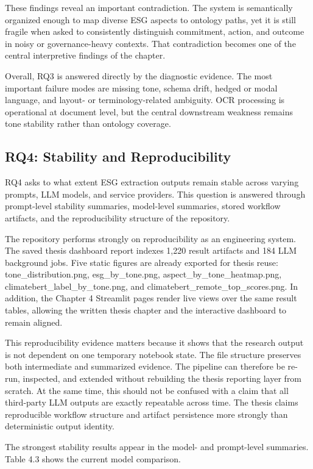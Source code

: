 \documentclass[english, online, cse, master]{dithesis}
\begin{document}
These findings reveal an important contradiction. The system is semantically organized enough to map diverse ESG aspects to ontology paths, yet it is still fragile when asked to consistently distinguish commitment, action, and outcome in noisy or governance-heavy contexts. That contradiction becomes one of the central interpretive findings of the chapter.

Overall, RQ3 is answered directly by the diagnostic evidence. The most important failure modes are missing tone, schema drift, hedged or modal language, and layout- or terminology-related ambiguity. OCR processing is operational at document level, but the central downstream weakness remains tone stability rather than ontology coverage.

\subsection{RQ4: Stability and Reproducibility}

RQ4 asks to what extent ESG extraction outputs remain stable across varying prompts, LLM models, and service providers. This question is answered through prompt-level stability summaries, model-level summaries, stored workflow artifacts, and the reproducibility structure of the repository.

The repository performs strongly on reproducibility as an engineering system. The saved thesis dashboard report indexes 1,220 result artifacts and 184 LLM background jobs. Five static figures are already exported for thesis reuse: tone\_distribution.png, esg\_by\_tone.png, aspect\_by\_tone\_heatmap.png, climatebert\_label\_by\_tone.png, and climatebert\_remote\_top\_scores.png. In addition, the Chapter 4 Streamlit pages render live views over the same result tables, allowing the written thesis chapter and the interactive dashboard to remain aligned.

This reproducibility evidence matters because it shows that the research output is not dependent on one temporary notebook state. The file structure preserves both intermediate and summarized evidence. The pipeline can therefore be re-run, inspected, and extended without rebuilding the thesis reporting layer from scratch. At the same time, this should not be confused with a claim that all third-party LLM outputs are exactly repeatable across time. The thesis claims reproducible workflow structure and artifact persistence more strongly than deterministic output identity.

The strongest stability results appear in the model- and prompt-level summaries. Table 4.3 shows the current model comparison.
\end{document}
